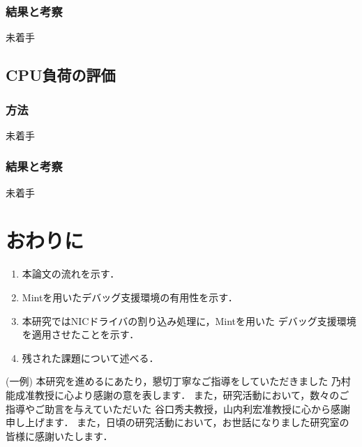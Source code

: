 \documentclass[tanilab-enum]{graduate}
\begin{document}
    \subsection{結果と考察}
    未着手
\section{CPU負荷の評価}
    \subsection{方法}
    未着手
    \subsection{結果と考察}
    未着手
\chapter{おわりに}\label{conclusion}
\begin{enumerate}
    \item 本論文の流れを示す．
    \item Mintを用いたデバッグ支援環境の有用性を示す．
    \item 本研究ではNICドライバの割り込み処理に，Mintを用いた
        デバッグ支援環境を適用させたことを示す．
    \item 残された課題について述べる．
\end{enumerate}


\acknowledgment\label{acknowledgement} %

(一例)
本研究を進めるにあたり，懇切丁寧なご指導をしていただきました
乃村能成准教授に心より感謝の意を表します．
また，研究活動において，数々のご指導やご助言を与えていただいた
谷口秀夫教授，山内利宏准教授に心から感謝申し上げます．
また，日頃の研究活動において，お世話になりました研究室の
皆様に感謝いたします．





\end{document}
